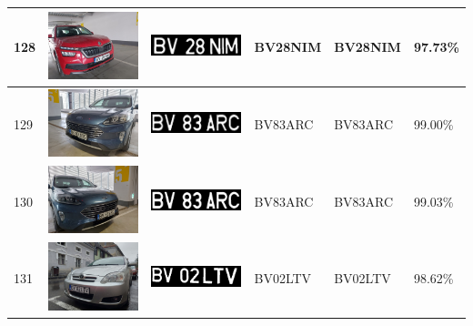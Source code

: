 \documentclass[a4paper,12pt]{report}
\begin{document}
\begin{longtable}{| m{0.6cm} | m{3cm} | m{3cm} | m{1.8cm} | m{1.8cm} | m{1.8cm} |}
    128 & \includegraphics[width=3cm,keepaspectratio]{dataset/75_s1.jpg}  & \includegraphics[width=3cm,keepaspectratio]{segmentari/128.jpg} & BV28NIM             & BV28NIM              & 97.73\%    \\ \hline
    129 & \includegraphics[width=3cm,keepaspectratio]{dataset/76_d1.jpg}  & \includegraphics[width=3cm,keepaspectratio]{segmentari/129.jpg} & BV83ARC             & BV83ARC              & 99.00\%    \\ \hline
    130 & \includegraphics[width=3cm,keepaspectratio]{dataset/76_s1.jpg}  & \includegraphics[width=3cm,keepaspectratio]{segmentari/130.jpg} & BV83ARC             & BV83ARC              & 99.03\%    \\ \hline
    131 & \includegraphics[width=3cm,keepaspectratio]{dataset/77_d1.jpg}  & \includegraphics[width=3cm,keepaspectratio]{segmentari/131.jpg} & BV02LTV             & BV02LTV              & 98.62\%    \\ \hline

\end{longtable}
\end{document}
